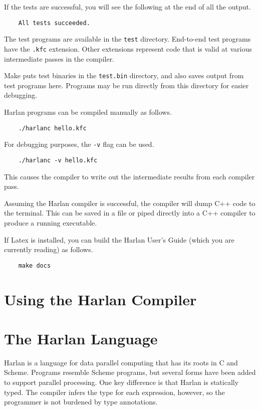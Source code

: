\documentclass{book}
\begin{document}
If the tests are successful, you will see the following at the end of
all the output.

\begin{verbatim}
    All tests succeeded.
\end{verbatim}

The test programs are available in the \texttt{test}
directory. End-to-end test programs have the \texttt{.kfc}
extension. Other extensions represent code that is valid at various
intermediate passes in the compiler.

Make puts test binaries in the \texttt{test.bin} directory, and also
saves output from test programs here. Programs may be run directly
from this directory for easier debugging.

Harlan programs can be compiled manually as follows.

\begin{verbatim}
    ./harlanc hello.kfc
\end{verbatim}

For debugging purposes, the \texttt{-v} flag can be used.

\begin{verbatim}
    ./harlanc -v hello.kfc
\end{verbatim}

This causes the compiler to write out the intermediate results from
each compiler pass.

Assuming the Harlan compiler is successful, the compiler will dump C++
code to the terminal. This can be saved in a file or piped directly
into a C++ compiler to produce a running executable.

If Latex is installed, you can build the Harlan User's Guide (which
you are currently reading) as follows.

\begin{verbatim}
    make docs
\end{verbatim}


\chapter{Using the Harlan Compiler}

\chapter{The Harlan Language}

Harlan is a language for data parallel computing that has its roots in
C and Scheme. Programs resemble Scheme programs, but several forms
have been added to support parallel processing. One key difference is
that Harlan is statically typed. The compiler infers the type for each
expression, however, so the programmer is not burdened by type
annotations.
\end{document}
